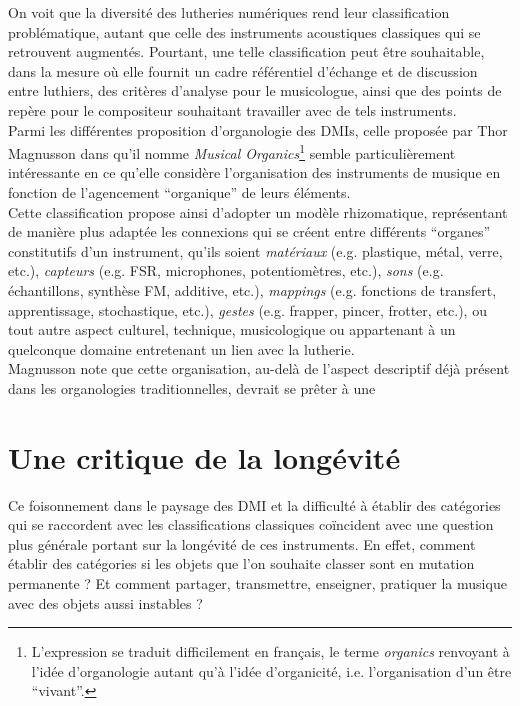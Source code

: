 \noindent On voit que la diversité des lutheries numériques rend leur classification problématique, autant que celle des instruments acoustiques classiques qui se retrouvent augmentés. Pourtant, une telle classification peut être souhaitable, dans la mesure où elle fournit un cadre référentiel d'échange et de discussion entre luthiers, des critères d'analyse pour le musicologue, ainsi que des points de repère pour le compositeur souhaitant travailler avec de tels instruments. \\
\indent Parmi les différentes proposition d'organologie des \glspl{DMI}, celle proposée par Thor Magnusson dans \cite{magnusson_musical_2017} qu'il nomme \textit{Musical Organics}\footnote{L'expression se traduit difficilement en français, le terme \textit{organics} renvoyant à l'idée d'organologie autant qu'à l'idée d'organicité, i.e. l'organisation d'un être ``vivant''.} semble particulièrement intéressante en ce qu'elle considère l'organisation des instruments de musique en fonction de l'agencement ``organique'' de leurs éléments.\\
\indent Cette classification propose ainsi d'adopter un modèle rhizomatique, représentant de manière plus adaptée les connexions qui se créent entre différents ``organes'' constitutifs d'un instrument, qu'ils soient \textit{matériaux} (e.g. plastique, métal, verre, etc.), \textit{capteurs} (e.g. \gls{FSR}, microphones, potentiomètres, etc.), \textit{sons} (e.g. échantillons, synthèse FM, additive, etc.), \textit{\glspl{mapping}} (e.g. fonctions de transfert, apprentissage, stochastique, etc.), \textit{gestes} (e.g. frapper, pincer, frotter, etc.), ou tout autre aspect culturel, technique, musicologique ou appartenant à un quelconque domaine entretenant un lien avec la lutherie.\\
\indent Magnusson note que cette organisation, au-delà de l'aspect descriptif déjà présent dans les organologies traditionnelles, devrait se prêter à une 

\section{Une critique de la longévité}
\label{sec:ephemerality:critique}

\noindent Ce foisonnement dans le paysage des \gls{DMI} et la difficulté à établir des catégories qui se raccordent avec les classifications classiques coïncident avec une question plus générale portant sur la longévité de ces instruments. En effet, comment établir des catégories si les objets que l'on souhaite classer sont en mutation permanente ? Et comment partager, transmettre, enseigner, pratiquer la musique avec des objets aussi instables ?

